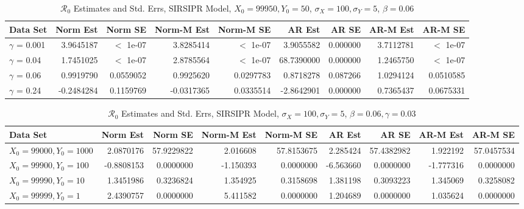 \message{ !name(draft_v13.tex)}\documentclass[12pt]{article}
\newcommand{\rr}{\ensuremath{\mathcal{R}_0}}
\begin{document}
\begin{table}[H]
	
	\caption{\label{tab:}$\rr$ Estimates and Std. Errs, SIRSIPR Model,
		$X_0 = 99950, Y_0 = 50$, $\sigma_X = 100, \sigma_Y = 5$, $\beta = 0.06$}
	\centering
	\begin{footnotesize}
		\begin{tabular}[t]{l|r|r|r|r|r|r|r|r}
			\hline
			Data Set & Norm Est & Norm SE & Norm-M Est & Norm-M SE & AR Est & AR SE & AR-M Est & AR-M SE\\
			\hline
			$\gamma$ = 0.001 & 3.9645187 & $<$ 1e-07 & 3.8285414 & $<$ 1e-07 & 3.9055582 & 0.000000 & 3.7112781 & $<$ 1e-07 \\
			\hline
			$\gamma$ = 0.04 & 1.7451025 & $<$ 1e-07 & 2.8785564 & $<$ 1e-07 & 68.7390000 & 0.000000 & 1.2465750 & $<$ 1e-07 \\
			\hline
			$\gamma$ = 0.06 & 0.9919790 & 0.0559052 & 0.9925620 & 0.0297783 & 0.8718278 & 0.087266 & 1.0294124 & 0.0510585\\
			\hline
			$\gamma$ = 0.24 & -0.2484284 & 0.1159769 & -0.0317365 & 0.0335514 & -2.8642901 & 0.000000 & 0.7365437 & 0.0675331\\
			\hline
		\end{tabular}
	\end{footnotesize}
\end{table}

\begin{table}[H]
	
	\caption{\label{tab:}$\rr$ Estimates and Std. Errs, SIRSIPR Model,
		$\sigma_X = 100, \sigma_Y = 5$, $\beta = 0.06, \gamma = 0.03$}
	\centering
	\begin{footnotesize}
		\begin{tabular}[t]{l|r|r|r|r|r|r|r|r}
			\hline
			Data Set & Norm Est & Norm SE & Norm-M Est & Norm-M SE & AR Est & AR SE & AR-M Est & AR-M SE\\
			\hline
			$X_0 = 99000, Y_0 = 1000$ & 2.0870176 & 57.9229822 & 2.016608 & 57.8153675 & 2.285424 & 57.4382982 & 1.922192 & 57.0457534\\
			\hline
			$X_0 = 99900, Y_0 = 100$ & -0.8808153 & 0.0000000 & -1.150393 & 0.0000000 & -6.563660 & 0.0000000 & -1.777316 & 0.0000000\\
			\hline
			$X_0 = 99990, Y_0 = 10$ & 1.3451986 & 0.3236824 & 1.354925 & 0.3158698 & 1.381198 & 0.3093223 & 1.345069 & 0.3258082\\
			\hline
			$X_0 = 99999, Y_0 = 1$ & 2.4390757 & 0.0000000 & 5.411582 & 0.0000000 & 1.204689 & 0.0000000 & 1.035624 & 0.0000000\\
			\hline
		\end{tabular}
	\end{footnotesize}
\end{table}
\end{document}
